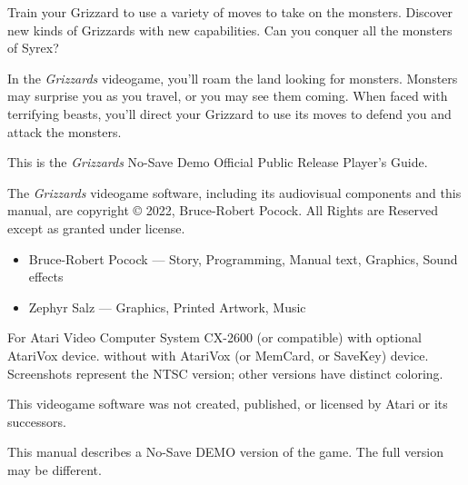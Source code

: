 \documentclass[10pt,twocolumn,openany,article]{memoir}
\begin{document}
Train your Grizzard to  use a variety of moves to  take on the monsters.
Discover new kinds  of Grizzards with new capabilities.  Can you conquer
all the monsters of Syrex?

\bigskip

In the  \textit{Grizzards} videogame, you'll  roam the land  looking for
monsters. Monsters may  surprise you as you travel, or  you may see them
coming. When faced  with terrifying beasts, you'll  direct your Grizzard
to use its moves to defend you and attack the monsters.

\vspace{1in}\vfill

This    is    the     \textit{Grizzards}    \ifdefined\NOSAVE    No-Save
\fi\ifdefined\DEMO Demo \fi\ifdefined\ATARIAGESAVE Official \else Public
Release \fi Player's Guide.

\vspace{12pt}

The  \textit{Grizzards} videogame  software,  including its  audiovisual
components   and  this   manual,   are   copyright  \copyright{}   2022,
Bruce-Robert  Pocock.   All  Rights  are  Reserved   except  as  granted
under license.

\begin{itemize}
\item Bruce-Robert Pocock --- Story, Programming, Manual text, Graphics,
  Sound effects
\item Zephyr Salz --- Graphics, Printed Artwork, Music
\end{itemize}

\bigskip

For   Atari    Video   Computer    System   CX-2600    (or   compatible)
\ifdefined\ATARIAGESAVE   with    optional   AtariVox    device.   \else
\ifdefined\NOSAVE  without  \else  with  \fi AtariVox  (or  MemCard,  or
SaveKey)  device.  \fi Screenshots  represent  the  NTSC version;  other
versions have distinct coloring.

\bigskip

This videogame software was not created, published, or licensed by Atari
or its successors.

\vspace{12pt}

\ifdefined\DEMO
\bigskip

This manual  describes a \ifdefined\NOSAVE  No-Save \fi DEMO  version of
the game. The full version may be different.

\fi
\end{document}
